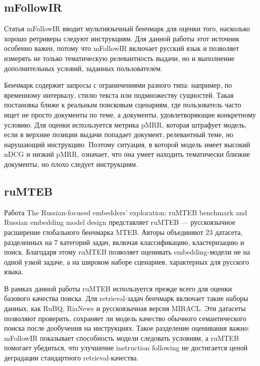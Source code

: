 \documentclass[12pt, a4paper, oneside]{article}
\begin{document}
\subsection{mFollowIR}

Статья mFollowIR \cite{weller2025mfollowirmultilingualbenchmarkinstruction} вводит 
мультиязычный бенчмарк для оценки того, насколько хорошо ретриверы следуют инструкциям. 
Для данной работы этот источник особенно важен, потому что mFollowIR включает русский язык 
и позволяет измерять не только тематическую релевантность выдачи, но и выполнение 
дополнительных условий, заданных пользователем.

Бенчмарк содержит запросы с ограничениями разного типа: например, 
по временному интервалу, стилю текста или подмножеству сущностей. 
Такая постановка ближе к реальным поисковым сценариям, где пользователь 
часто ищет не просто документы по теме, а документы, удовлетворяющие конкретному условию. 
Для оценки используется метрика pMRR, которая штрафует модель, если в верхние позиции выдачи 
попадает документ, релевантный теме, но нарушающий инструкцию. Поэтому ситуация, в которой 
модель имеет высокий nDCG и низкий pMRR, означает, что она умеет находить тематически 
близкие документы, но плохо следует инструкциям.

\subsection{ruMTEB}

Работа The Russian-focused embedders' exploration: ruMTEB benchmark 
and Russian embedding model design \cite{snegirev2025russianfocusedembeddersexplorationrumteb} 
представляет ruMTEB --- русскоязычное расширение глобального бенчмарка MTEB. 
Авторы объединяют 23 датасета, разделенных на 7 категорий задач, включая классификацию, 
кластеризацию и поиск. Благодаря этому ruMTEB позволяет оценивать embedding-модели не на 
одной узкой задаче, а на широком наборе сценариев, характерных для русского языка.

В рамках данной работы ruMTEB используется прежде всего для оценки базового 
качества поиска. Для retrieval-задач бенчмарк включает такие наборы данных, 
как RuBQ, RiaNews и русскоязычная версия MIRACL. 
Эти датасеты позволяют проверить, сохраняет ли модель качество обычного семантического 
поиска после дообучения на инструкциях. Такое разделение оценивания важно: mFollowIR 
показывает способность модели следовать условиям, а ruMTEB помогает убедиться, 
что улучшение instruction following не достигается ценой деградации 
стандартного retrieval-качества.
\end{document}
